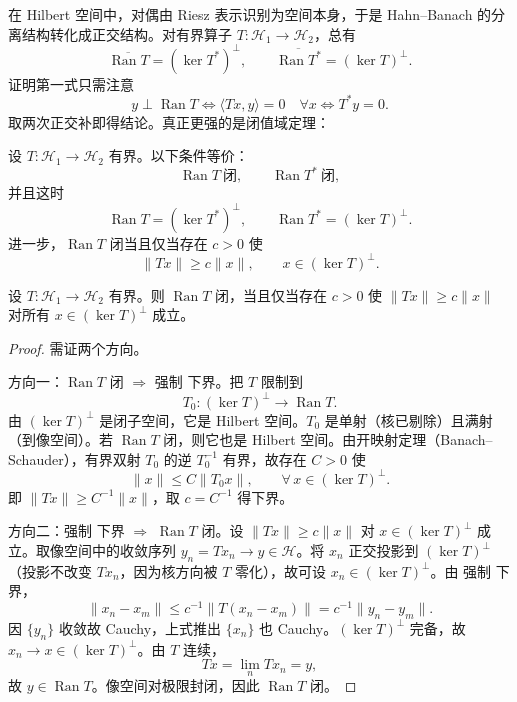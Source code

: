 在 Hilbert 空间中，对偶由 Riesz 表示识别为空间本身，于是 Hahn--Banach 的分离结构转化成正交结构。对有界算子 $T:\mathcal H_1\to\mathcal H_2$，总有
\[
\overline{\operatorname{Ran}T}
=(\ker T^*)^\perp,
\qquad
\overline{\operatorname{Ran}T^*}
=(\ker T)^\perp.
\]
证明第一式只需注意
\[
y\perp\operatorname{Ran}T
\iff
\langle Tx,y\rangle=0\quad\forall x
\iff
T^*y=0.
\]
取两次正交补即得结论。真正更强的是闭值域定理：

\begin{theorem}[闭值域定理]
设 $T:\mathcal H_1\to\mathcal H_2$ 有界。以下条件等价：
\[
\operatorname{Ran}T\ \text{闭},
\qquad
\operatorname{Ran}T^*\ \text{闭},
\]
并且这时
\[
\operatorname{Ran}T=(\ker T^*)^\perp,
\qquad
\operatorname{Ran}T^*=(\ker T)^\perp.
\]
进一步，$\operatorname{Ran}T$ 闭当且仅当存在 $c>0$ 使
\[
{
\|Tx\|\ge c\|x\|,
\qquad x\in(\ker T)^\perp
}.
\]
\end{theorem}

\begin{proposition}[闭值域与核补空间上的下界]
设 $T:\mathcal H_1\to\mathcal H_2$ 有界。则 $\operatorname{Ran}T$ 闭，当且仅当存在 $c>0$ 使 $\|Tx\|\ge c\|x\|$ 对所有 $x\in(\ker T)^\perp$ 成立。
\end{proposition}
\begin{proof}
需证两个方向。

方向一：$\operatorname{Ran}T$ 闭 $\Rightarrow$ 强制 下界。把 $T$ 限制到
\begin{equation*}
 T_0:(\ker T)^\perp\longrightarrow\operatorname{Ran}T.
\end{equation*}
由 $(\ker T)^\perp$ 是闭子空间，它是 Hilbert 空间。$T_0$ 是单射（核已剔除）且满射（到像空间）。若 $\operatorname{Ran}T$ 闭，则它也是 Hilbert 空间。由开映射定理（Banach--Schauder），有界双射 $T_0$ 的逆 $T_0^{-1}$ 有界，故存在 $C>0$ 使
\begin{equation*}
 \|x\|\le C\|T_0x\|,
 \qquad \forall\,x\in(\ker T)^\perp.
\end{equation*}
即 $\|Tx\|\ge C^{-1}\|x\|$，取 $c=C^{-1}$ 得下界。

方向二：强制 下界 $\Rightarrow$ $\operatorname{Ran}T$ 闭。设 $\|Tx\|\ge c\|x\|$ 对 $x\in(\ker T)^\perp$ 成立。取像空间中的收敛序列 $y_n=Tx_n\to y\in\mathcal H$。将 $x_n$ 正交投影到 $(\ker T)^\perp$（投影不改变 $Tx_n$，因为核方向被 $T$ 零化），故可设 $x_n\in(\ker T)^\perp$。由 强制 下界，
\begin{equation*}
 \|x_n-x_m\|
 \le c^{-1}\|T(x_n-x_m)\|
 =c^{-1}\|y_n-y_m\|.
\end{equation*}
因 $\{y_n\}$ 收敛故 Cauchy，上式推出 $\{x_n\}$ 也 Cauchy。$(\ker T)^\perp$ 完备，故 $x_n\to x\in(\ker T)^\perp$。由 $T$ 连续，
\begin{equation*}
 Tx=\lim_n Tx_n=y,
\end{equation*}
故 $y\in\operatorname{Ran}T$。像空间对极限封闭，因此 $\operatorname{Ran}T$ 闭。
\end{proof}


